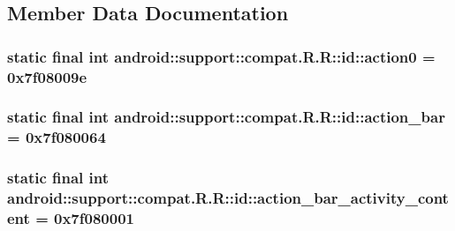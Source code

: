 \subsection{Member Data Documentation}
\hypertarget{classandroid_1_1support_1_1compat_1_1_r_1_1id_b841660b3416ed60cf324155f916740d}{
\subsubsection[{action0}]{\setlength{\rightskip}{0pt plus 5cm}static final int android::support::compat.R.R::id::action0 = 0x7f08009e}}
\label{classandroid_1_1support_1_1compat_1_1_r_1_1id_b841660b3416ed60cf324155f916740d}


\hypertarget{classandroid_1_1support_1_1compat_1_1_r_1_1id_a2c397bdcd1b2640a4a61efcd56a01f0}{
\subsubsection[{action\_\-bar}]{\setlength{\rightskip}{0pt plus 5cm}static final int android::support::compat.R.R::id::action\_\-bar = 0x7f080064}}
\label{classandroid_1_1support_1_1compat_1_1_r_1_1id_a2c397bdcd1b2640a4a61efcd56a01f0}


\hypertarget{classandroid_1_1support_1_1compat_1_1_r_1_1id_80189ae1bc621428c027db4b8e398c63}{
\subsubsection[{action\_\-bar\_\-activity\_\-content}]{\setlength{\rightskip}{0pt plus 5cm}static final int android::support::compat.R.R::id::action\_\-bar\_\-activity\_\-content = 0x7f080001}}
\label{classandroid_1_1support_1_1compat_1_1_r_1_1id_80189ae1bc621428c027db4b8e398c63}


